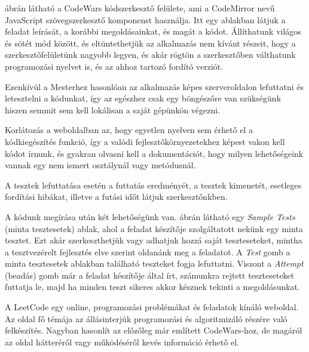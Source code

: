 ábrán látható a CodeWars kódszerkesztő felülete, ami a CodeMirror nevű JavaScript szövegszerkesztő komponenst használja. Itt egy ablakban látjuk a feladat leírását, a korábbi megoldásainkat, és magát a kódot. Állíthatunk világos és sötét mód között, és eltüntethetjük az alkalmazás nem kívánt részeit, hogy a szerkesztőfelületünk nagyobb legyen, és akár rögtön a szerkesztőben válthatunk programozási nyelvet is, és az ahhoz tartozó fordító verziót.

Ezenkívül a Mesterhez hasonlóan az alkalmazás képes szerveroldalon lefuttatni és letesztelni a kódunkat, így az egészhez csak egy böngészőre van szükségünk hiszen semmit sem kell lokálisan a saját gépünkön végezni.

Korlátozás a weboldalban az, hogy egyetlen nyelven sem érhető el a kódkiegészítés funkció, így a valódi fejlesztőkörnyezetekhez képest vakon kell kódot írnunk, és gyakran olvasni kell a dokumentációt, hogy milyen lehetőségeink vannak egy nem ismert osztálynál vagy metódusnál.

A tesztek lefuttatása esetén a futtatás eredményét, a tesztek kimenetét, esetleges fordítási hibákat, illetve a futási időt látjuk szerkesztőnkben.

A kódunk megírása után két lehetőségünk van.  ábrán látható egy \emph{Sample Tests} (minta tesztesetek) ablak, ahol a feladat készítője szolgáltatott nekünk egy minta tesztet. Ezt akár szerkeszthetjük vagy adhatjuk hozzá saját teszteseteket, mintha a tesztvezérelt fejlesztés elve szerint oldanánk meg a feladatot. A \emph{Test} gomb a minta tesztesetek ablakban található teszteket fogja lefuttatni. Viszont a \emph{Attempt} (beadás) gomb már a feladat készítője által írt, számunkra rejtett teszteseteket futtatja le, majd ha minden teszt sikeres akkor késznek tekinti a megoldásunkat.


A LeetCode egy online, programozási problémákat és feladatok kínáló weboldal. Az oldal fő témája az állásinterjúk programozási és algoritmizáló részére való felkészítés. \cite{leetcode} Nagyban hasonlít az előzőleg már említett CodeWars-hoz, de magáról az oldal hátteréről vagy működéséről kevés információ érhető el.

